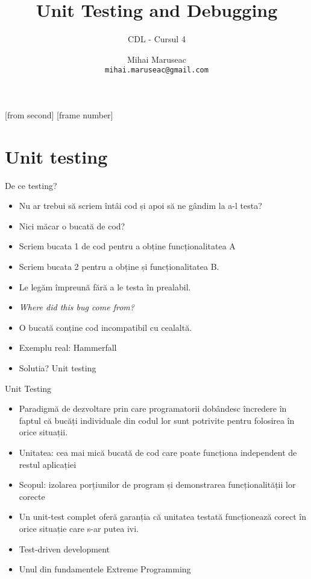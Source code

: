 \documentclass{beamer}
\title[Unit Testing and Debugging]{Unit Testing and Debugging}
\subtitle{CDL - Cursul 4}
\institute{ROSEdu}
\author{Mihai Maruseac \\\texttt{mihai.maruseac@gmail.com}}
\begin{document}
[from second]
[frame number]

\frame{\titlepage}

\frame{\tableofcontents}

\section{Unit testing}
\frame{\tableofcontents[currentsection]}

\begin{frame}{De ce testing?}
\begin{itemize}
\item Nu ar trebui să scriem întâi cod și apoi să ne gândim la a-l testa?
\item \pause Nici măcar o bucată de cod?
\item \pause Scriem bucata 1 de cod pentru a obține funcționalitatea A
\item \pause Scriem bucata 2 pentru a obține și funcționalitatea B.
\item \pause Le legăm împreună fără a le testa în prealabil.
\item \pause \textit{Where did this bug come from?}
\item \pause O bucată conține cod incompatibil cu cealaltă.
\item \pause Exemplu real: \pause Hammerfall
\item \pause Solutia? \pause Unit testing
\end{itemize}
\end{frame}

\begin{frame}{Unit Testing}
\begin{itemize}
\item Paradigmă de dezvoltare prin care programatorii dobândesc încredere în faptul că bucăți individuale din codul lor sunt potrivite pentru folosirea în orice situații.
\item \pause Unitatea: cea mai mică bucată de cod care poate funcționa independent de restul aplicației
\item \pause Scopul: izolarea porțiunilor de program și demonstrarea funcționalității lor corecte
\item \pause Un unit-test complet oferă garanția că unitatea testată funcționează corect în orice situație care s-ar putea ivi.
\item \pause Test-driven development
\item \pause Unul din fundamentele Extreme Programming
\end{itemize}
\end{frame}
\end{document}
